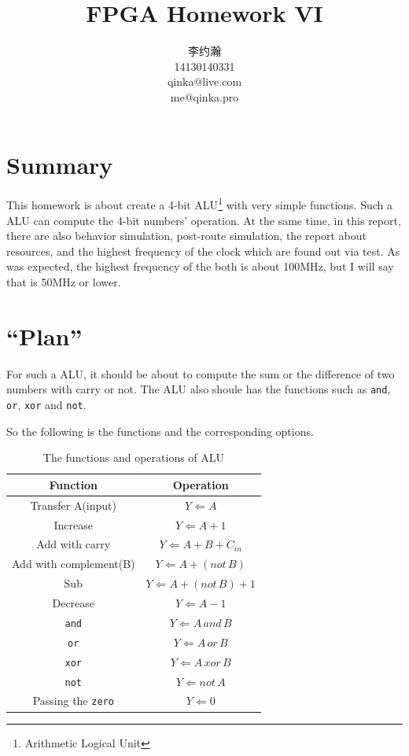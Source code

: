 \documentclass{article}
\title{FPGA Homework VI}
\author{李约瀚 \\ 14130140331 \\ qinka@live.com \\ me@qinka.pro}
\begin{document}
    \maketitle
    \newpage
    \tableofcontents
    \newpage
    
    \section{Summary}
    \label{sec:summary}
    
    This homework is about create a 4-bit ALU\footnote{Arithmetic Logical Unit} with very simple functions.
    Such a ALU can compute the 4-bit numbers' operation.
    At the same time, in this report, there are also behavior simulation, post-route simulation, the report about resources,
    and the highest frequency of the clock which are found out via test.
    As was expected, the highest frequency of the both is about 100MHz, but I will say that is 50MHz or lower.
    
    \section{``Plan''}
    \label{sec:plan}
    
    For such a ALU, it should be about to compute the sum or the difference of two numbers with carry or not.
    The ALU also shoule has the functions such as \verb|and|, \verb|or|, \verb|xor| and \verb|not|.
    
    So the following is the functions and the corresponding options.
    
    \begin{table}[h!]
        \centering
        \begin{tabular}{|c|c|}
            \hline Function & Operation \\ 
            \hline Transfer A(input) & $Y \Leftarrow A$ \\ 
            \hline Increase & $ Y \Leftarrow A + 1$ \\ 
            \hline Add with carry & $Y \Leftarrow A + B + C_{in}$ \\ 
            \hline Add with complement(B)  & $Y \Leftarrow A + (not\,B)$ \\ 
            \hline Sub & $Y \Leftarrow A +(not\,B) + 1$ \\
            \hline Decrease & $ Y \Leftarrow A - 1$ \\
            \hline \verb|and| & $ Y \Leftarrow A\,and\,B $ \\
            \hline \verb|or|  & $ Y \Leftarrow A\,or\,B $ \\
            \hline \verb|xor| & $ Y \Leftarrow A\,xor\,B $ \\
            \hline \verb|not| & $ Y \Leftarrow not\,A$ \\
            \hline Passing the \verb|zero| & $ Y \Leftarrow 0 $\\
            \hline
        \end{tabular} 
        \caption{The functions and operations of ALU}
        \label{tab:alu:fno}
    \end{table}
    
\end{document}
